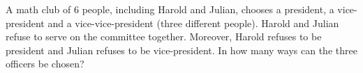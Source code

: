 A math club of $6$ people, including Harold and Julian, chooses a president, a vice-president and a vice-vice-president (three different people). Harold and Julian refuse to serve on the committee together. Moreover, Harold refuses to be president and Julian refuses to be vice-president. In how many ways can the three officers be chosen?
